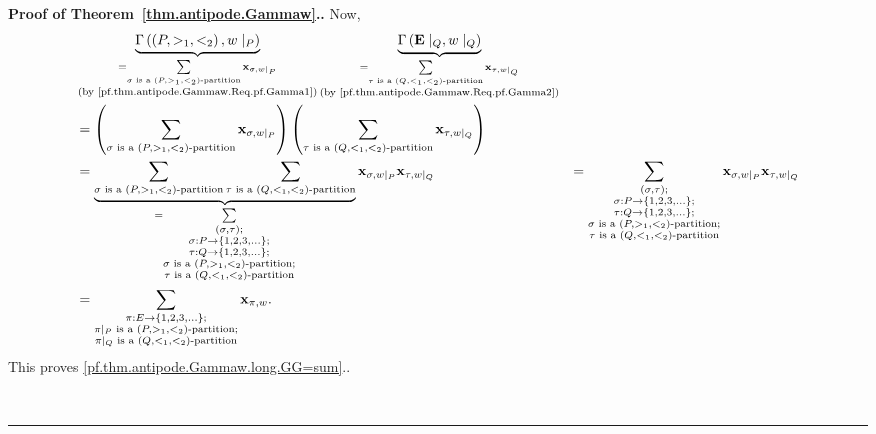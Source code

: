 \documentclass[numbers=enddot,12pt,final,onecolumn,notitlepage,abstracton]{scrartcl}
\theoremstyle{definition}
\newenvironment{proof}[1][Proof]{\noindent\textbf{#1.} }{\ \rule{0.5em}{0.5em}}
\let\sumnonlimits\sum
\renewcommand{\sum}{\sumnonlimits\limits}
\newenvironment{verlong}{}{}
\newcommand{\xx}{{\mathbf{x}}}
\newcommand{\EE}{{\mathbf{E}}}
\begin{document}
\begin{proof}[Proof of Theorem~\ref{thm.antipode.Gammaw}.]
\begin{verlong}
{Now,
\begin{align*}
&
\underbrace{\Gamma\left(\left(P, >_1, <_2\right), w\mid_P\right)}_{
 \substack{ = \sum_{\sigma \text{ is a }\left(P, >_1, <_2\right)\text{-partition}}
            \xx_{\sigma, w\mid_P} \\
            \text{(by \eqref{pf.thm.antipode.Gammaw.Req.pf.Gamma1})}}}
\underbrace{\Gamma\left(\EE\mid_Q, w\mid_Q\right)}_{
 \substack{ = \sum_{\tau \text{ is a }\left(Q, <_1, <_2\right)\text{-partition}}
            \xx_{\tau, w\mid_Q} \\
            \text{(by \eqref{pf.thm.antipode.Gammaw.Req.pf.Gamma2})}}}
\\
&=
\left(\sum_{\sigma \text{ is a }\left(P, >_1, <_2\right)\text{-partition}}
\xx_{\sigma, w\mid_P}\right)
\left(\sum_{\tau \text{ is a }\left(Q, <_1, <_2\right)\text{-partition}}
\xx_{\tau, w\mid_Q}\right) \\
&=
\underbrace{
 \sum_{\sigma \text{ is a }\left(P, >_1, <_2\right)\text{-partition}}
 \sum_{\tau \text{ is a }\left(Q, <_1, <_2\right)\text{-partition}}
}_{=
   \sum_{\substack{\left(\sigma, \tau\right); \\
                   \sigma : P \to \left\{1, 2, 3, \ldots\right\}; \\
                   \tau : Q \to \left\{1, 2, 3, \ldots\right\}; \\
                   \sigma \text{ is a }\left(P, >_1, <_2\right)\text{-partition;} \\
                   \tau \text{ is a }\left(Q, <_1, <_2\right)\text{-partition}}}
   }
\xx_{\sigma, w\mid_P} \xx_{\tau, w\mid_Q}
&=
\sum_{\substack{\left(\sigma, \tau\right); \\
                \sigma : P \to \left\{1, 2, 3, \ldots\right\}; \\
                \tau : Q \to \left\{1, 2, 3, \ldots\right\}; \\
                \sigma \text{ is a }\left(P, >_1, <_2\right)\text{-partition;} \\
                \tau \text{ is a }\left(Q, <_1, <_2\right)\text{-partition}}}
\xx_{\sigma, w\mid_P} \xx_{\tau, w\mid_Q} \\
&= \sum_{\substack{\pi : E \to \left\{1, 2, 3, \ldots\right\}; \\
                \pi\mid_P \text{ is a }\left(P, >_1, <_2\right)\text{-partition;} \\
                \pi\mid_Q \text{ is a }\left(Q, <_1, <_2\right)\text{-partition}}}
\xx_{\pi, w}.
\end{align*}
This proves \eqref{pf.thm.antipode.Gammaw.long.GG=sum}.}.


\end{verlong}
\end{proof}
\end{document}
